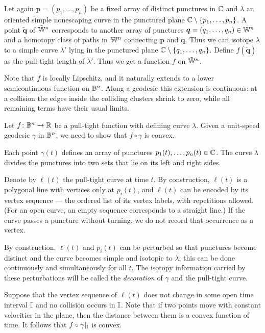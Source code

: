 \documentclass[a4paper,10pt]{article}
\begin{document}
Let again $\bm p=(p_1,\ldots,p_n)$ be a fixed array of distinct punctures in $\mathbb{C}$ and $\lambda$ an oriented simple nonescaping curve in the punctured plane $\mathbb{C} \setminus \{p_1,\ldots,p_n\}$.
A point $\bm{\tilde q}$ of $\tilde {\mathbb{W}}^n$ corresponds to another array of punctures $\bm q=(q_1,\ldots,q_n)\in \mathbb{W}^n$ and a homotopy class of paths in $\mathbb{W}^n$ connecting $\bm p$ and $\bm q$.
Thus we can isotope $\lambda$ to a simple curve $\lambda'$ lying in the punctured plane $\mathbb{C}\setminus \{q_1,\ldots,q_n\}$.
Define $f(\bm{\tilde q})$ as the pull-tight length of $\lambda'$.
Thus we get a function $f$ on $\tilde {\mathbb{W}}^n$.

Note that $f$ is locally Lipschitz, and it naturally extends to a lower semicontinuous function on $\mathbb{B}^n$.
Along a geodesic this extension is continuous: at a collision the edges inside the colliding clusters shrink to zero, while all remaining terms have their usual limits.

Let $f\colon\mathbb{B}^n\to \mathbb{R}$ be a pull-tight function with defining curve $\lambda$.
Given a unit-speed geodesic $\gamma$ in $\mathbb{B}^n$,
we need to show that $f\circ\gamma$ is convex.

Each point $\gamma(t)$ defines an array of punctures $p_1(t),\ldots,p_n(t)\in\mathbb{C}$.
The curve $\lambda$ divides the punctures into two sets that lie on its left and right sides.

Denote by $\ell(t)$ the pull-tight curve at time $t$.
By construction, $\ell(t)$ is a polygonal line with vertices only at $p_i(t)$,
and $\ell(t)$ can be encoded by its vertex sequence --- the ordered list of its vertex labels, with repetitions allowed.
(For an open curve, an empty sequence corresponds to a straight line.)
If the curve passes a puncture without turning, we do not record that occurrence as a vertex.

By construction, $\ell(t)$ and $p_i(t)$ can be perturbed so that punctures become distinct and the curve becomes simple and isotopic to $\lambda$;
this can be done continuously and simultaneously for all $t$.
The isotopy information carried by these perturbations will be called the \emph{decoration} of $\gamma$ and the pull-tight curve.

Suppose that the vertex sequence of $\ell(t)$ does not change in some open time interval $\mathbb{I}$ and no collision occurs in $\mathbb{I}$.
Note that if two points move with constant velocities in the plane, then the distance between them is a convex function of time.
It follows that $f\circ\gamma|_{\mathbb{I}}$ is convex.
\end{document}
